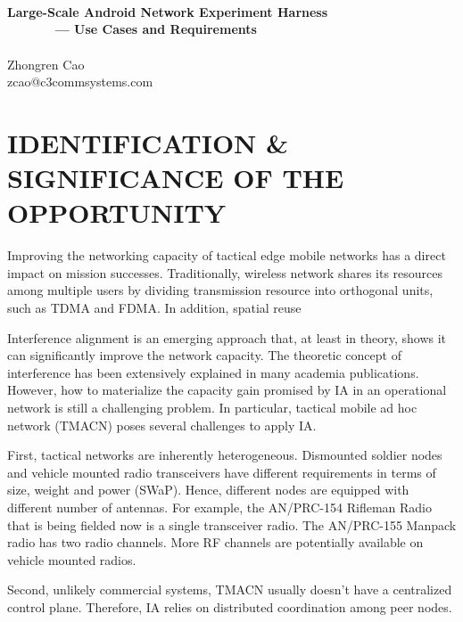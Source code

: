 \documentclass[letterpaper,11pt,onecolumn]{article}
\begin{document}

\thispagestyle{fancy}

\begin{center}
~\\
~\\
~\\
{\Large{\bf{Large-Scale Android Network Experiment Harness\\
~~~~~~ --- Use Cases and Requirements}}}\\
~\\
\vspace{0.1in}
Zhongren Cao\\
zcao@c3commsystems.com
\end{center}

\vspace{0.1in}

\section{IDENTIFICATION \& SIGNIFICANCE OF THE OPPORTUNITY}


Improving the networking capacity of tactical edge mobile networks has a direct impact on mission successes. Traditionally, wireless network shares its resources among multiple users by dividing transmission resource into orthogonal units, such as TDMA and FDMA. In addition, spatial reuse 

Interference alignment is an emerging approach that, at least in theory, shows it can significantly improve the network capacity. The theoretic concept of interference has been extensively explained in many academia publications. However, how to materialize the capacity gain promised by IA in an operational network is still a challenging problem. In particular, tactical mobile ad hoc network (TMACN) poses several challenges to apply IA. 

First, tactical networks are inherently heterogeneous. Dismounted soldier nodes and vehicle mounted radio transceivers have different requirements in terms of size, weight and power (SWaP). Hence, different nodes are equipped with different number of antennas. For example, the AN/PRC-154 Rifleman Radio that is being fielded now is a single transceiver radio. The AN/PRC-155 Manpack radio has two radio channels. More RF channels are potentially  available on vehicle mounted radios. 

Second, unlikely commercial systems, TMACN usually doesn't have a centralized control plane. Therefore, IA relies on distributed coordination among peer nodes. 
\end{document}
